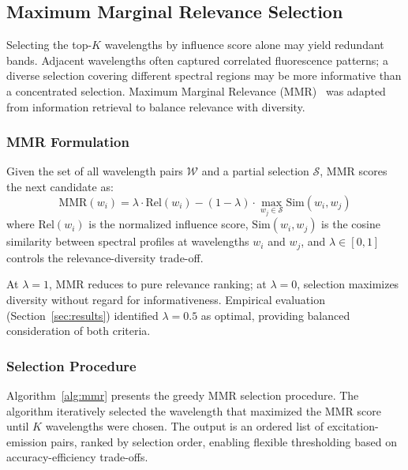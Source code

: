 \subsection{Maximum Marginal Relevance Selection}
\label{sec:mmr}

Selecting the top-$K$ wavelengths by influence score alone may yield redundant bands.
Adjacent wavelengths often captured correlated fluorescence patterns; a diverse selection covering different spectral regions may be more informative than a concentrated selection.
Maximum Marginal Relevance (MMR)~\cite{carbonell1998use} was adapted from information retrieval to balance relevance with diversity.

\subsubsection{MMR Formulation}
Given the set of all wavelength pairs $\mathcal{W}$ and a partial selection $\mathcal{S}$, MMR scores the next candidate as:
\begin{equation}
\text{MMR}(w_i) = \lambda \cdot \text{Rel}(w_i) - (1 - \lambda) \cdot \max_{w_j \in \mathcal{S}} \text{Sim}(w_i, w_j)
\label{eq:mmr}
\end{equation}
where $\text{Rel}(w_i)$ is the normalized influence score, $\text{Sim}(w_i, w_j)$ is the cosine similarity between spectral profiles at wavelengths $w_i$ and $w_j$, and $\lambda \in [0, 1]$ controls the relevance-diversity trade-off.

At $\lambda = 1$, MMR reduces to pure relevance ranking; at $\lambda = 0$, selection maximizes diversity without regard for informativeness.
Empirical evaluation (Section~\ref{sec:results}) identified $\lambda = 0.5$ as optimal, providing balanced consideration of both criteria.

\subsubsection{Selection Procedure}
Algorithm~\ref{alg:mmr} presents the greedy MMR selection procedure.
The algorithm iteratively selected the wavelength that maximized the MMR score until $K$ wavelengths were chosen.
The output is an ordered list of excitation-emission pairs, ranked by selection order, enabling flexible thresholding based on accuracy-efficiency trade-offs.

